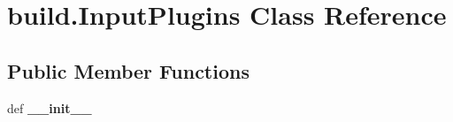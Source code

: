 \hypertarget{classbuild_1_1InputPlugins}{\section{build.\-Input\-Plugins \-Class \-Reference}
\label{classbuild_1_1InputPlugins}
}
\subsection*{\-Public \-Member \-Functions}
\begin{DoxyCompactItemize}
\item 
\hypertarget{classbuild_1_1InputPlugins_a9daf25c71f893ee693b455f5c1906080}{def {\bfseries \-\_\-\-\_\-init\-\_\-\-\_\-}}\label{classbuild_1_1InputPlugins_a9daf25c71f893ee693b455f5c1906080}

\end{DoxyCompactItemize}
